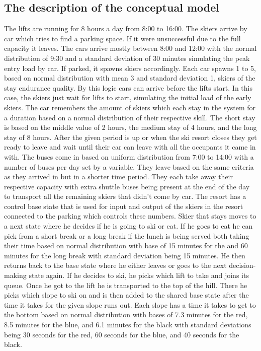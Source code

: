 \documentclass[11pt,a4paper]{article}
\begin{document}
\subsection{The description of the conceptual model}
The lifts are running for 8 hours a day from 8:00 to 16:00. The skiers arrive by car which tries to find a parking space. If it were unsuccessful due to the full capacity it leaves. The cars arrive mostly between 8:00 and 12:00 with the normal distribution of 9:30 and a standard deviation of 30 minutes simulating the peak entry load by car. If parked, it spawns skiers accordingly. Each car spawns 1 to 5, based on normal distribution with mean 3 and standard deviation 1, skiers of the stay endurance quality. By this logic cars can arrive before the lifts start. In this case, the skiers just wait for lifts to start, simulating the initial load of the early skiers. The car remembers the amount of skiers which each stay in the system for a duration based on a normal distribution of their 
respective skill. The short stay is based on the middle value of 2 hours, the medium stay of 4 hours, and the long stay of 8 hours. After the given period is up or when the ski resort closes they get ready to leave and wait until their car can leave with all the occupants it came in with. The buses come in based on uniform distribution\cite[str. 89]{slides} from 7:00 to 14:00 with a number of buses per day set by a variable. They leave based on the same criteria as they arrived in but in a shorter time period. They each take away their respective capacity with extra shuttle buses being present at the end of the day to transport all the remaining skiers that didn't come by car. \newline
The resort has a control base state that is used for input and output of the skiers in the resort connected to the parking which controls these numbers. Skier that stays moves to a next state where he decides if he is going to ski or eat. If he goes to eat he can pick from a short break or a long break if the lunch is being served both taking their time based on normal distribution with base of 15 minutes for the and 60 minutes for the long break with standard deviation being 15 minutes. He then returns back to the base state where he either leaves or goes to the next decision-making state again. If he decides to ski, he picks which lift to take and joins its queue. Once he got to the lift he is transported to the top of the hill. There he picks which slope to ski on and is then added to the shared base state after the time it takes for the given slope runs out. Each slope has a time it takes to get to the bottom based on normal distribution with bases of 7.3 minutes for the red, 8.5 minutes for the blue, and 6.1 minutes for the  black with standard deviations being 30 seconds for the red, 60 seconds for the blue, and 40 seconds for the black.  
\end{document}

